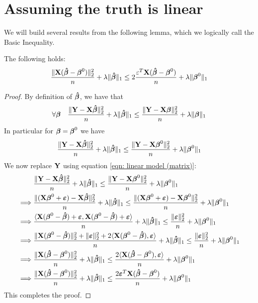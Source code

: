 \section{Assuming the truth is linear}
\label{section: assuming truth is linear}
We will build several results from the following lemma, which we logically call the Basic Inequality.
\begin{lemma}
    \label{lemma: basic inequality}
    The following holds:
    \[
        \frac{\| \X (\btahat-\bta^{0})\|_{2}^{2}}{n} + \lambda\|\btahat\|_{1} \leq 2 \frac{\varepsilon^{T} \X (\btahat-\bta^{0})}{n}+\lambda \| \bta^{0} \|_{1}
    \]
\end{lemma}
\begin{proof}
    By definition of $\btahat$, we have that
    \[
        \forall \bta \quad \frac{\| \Y-\X \btahat \|_{2}^{2}}{n} + \lambda \| \btahat \|_{1} \leq \frac{\|\Y-\X \bta \|_{2}^{2}}{n}+\lambda \| \bta \|_{1}
    \]
    In particular for $\bta = \bta^0$ we have
    \[
        \frac{\| \Y-\X \btahat \|_{2}^{2}}{n}+\lambda\| \btahat \|_{1} \leq \frac{ \| \Y-\X \bta^0\|_{2}^{2}}{n}+\lambda \| \bta^0\|_{1}
    \]
    We now replace $\Y$ using equation \eqref{eqn: linear model (matrix)}:
    \begin{align*}
                 & \frac{\|\Y  - \X \btahat \|_{2}^{2}}{n} + \lambda \| \btahat\|_{1} \leq \frac{\| \Y  - \X \bta^0 \|_2^2}{n}+\lambda\|\bta^{0}\|_{1}                                                     \\
        \implies &
        \frac{\| (\X \bta^0 + \eps) - \X \btahat \|_{2}^{2}}{n}+\lambda\| \btahat \|_{1} \leq \frac{ \| (\X \bta^0 + \eps)-\X \bta^0\|_{2}^{2}}{n}+\lambda \| \bta^0\|_{1}                                 \\
        \implies &
        \frac{\langle \X ( \bta^0 - \btahat) + \eps, \X ( \bta^0 - \btahat) + \eps \rangle}{n}+\lambda \| \btahat \|_{1} \leq \frac{ \| \eps \|_{2}^{2}}{n}+\lambda \| \bta^0\|_{1}                        \\
        \implies &
        \frac{\| \X (\bta^0 - \btahat) \| _2^2 + \| \eps \|_2^2 + 2 \langle \X ( \bta^0 - \btahat),  \eps \rangle}{n}+\lambda \| \btahat \|_{1} \leq \frac{ \| \eps \|_{2}^{2}}{n}+\lambda \| \bta^0\|_{1} \\
        \implies &
        \frac{\| \X (\btahat - \bta^0) \| _2^2}{n} + \lambda \| \btahat \|_{1} \leq \frac{2 \langle \X ( \btahat - \bta^0),  \eps \rangle}{n} + \lambda \| \bta^0\|_{1}                                    \\
        \implies &
        \frac{\| \X (\btahat - \bta^0) \| _2^2}{n} + \lambda \| \btahat \|_{1} \leq \frac{2 \eps^T \X ( \btahat - \bta^0)}{n} + \lambda \| \bta^0\|_{1}                                                    \\
    \end{align*}
    This completes the proof.
\end{proof}
